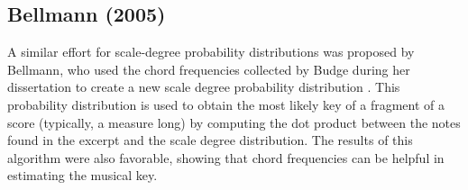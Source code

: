 

\subsection{Bellmann (2005)}

A similar effort for scale-degree probability distributions was proposed by Bellmann, who used the chord frequencies collected by Budge during her dissertation \cite{budge_study_1943} to create a new scale degree probability distribution \cite{bellmann_about_2006}. This probability distribution is used to obtain the most likely key of a fragment of a score (typically, a measure long) by computing the dot product between the notes found in the excerpt and the scale degree distribution. The results of this algorithm were also favorable, showing that chord frequencies can be helpful in estimating the musical key.





